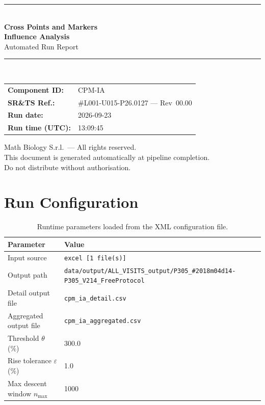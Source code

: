 \documentclass[a4paper,11pt]{article}
\begin{document}
\begin{titlepage}
\begin{center}
  \vspace*{1.8cm}
  {\color{dmaaccent}\rule{\linewidth}{1.5pt}}\\[0.6cm]
  {\LARGE\bfseries\color{dmaaccent}
    Cross Points and Markers\\[0.25cm]
    Influence Analysis}\\[0.4cm]
  {\Large Automated Run Report}\\[0.3cm]
  {\color{dmaaccent}\rule{\linewidth}{1.5pt}}\\[2cm]

  \begin{tabular}{ll}
    \textbf{Component ID:}   & CPM-IA \\[0.3cm]
    \textbf{SR\&TS Ref.:}    & \#L001-U015-P26.0127 --- Rev~00.00 \\[0.3cm]
    \textbf{Run date:}       & 2026-09-23 \\[0.3cm]
    \textbf{Run time (UTC):} & 13:09:45 \\
  \end{tabular}

  \vfill
  {\color{dmagray}\small
    Math Biology S.r.l.\ --- All rights reserved.\\
    This document is generated automatically at pipeline completion.\\
    Do not distribute without authorisation.}
\end{center}
\end{titlepage}

\tableofcontents
\clearpage

\section{Run Configuration}

\begin{table}[h!]
\centering
\small
\caption{Runtime parameters loaded from the XML configuration file.}
\begin{tabular}{ll}
\toprule
\textbf{Parameter} & \textbf{Value} \\
\midrule
Input source                      & \texttt{excel [1 file(s)]} \\
Output path                       & \texttt{data/output/ALL\_VISITS\_output/P305\_\#2018m04d14-P305\_V214\_FreeProtocol} \\
Detail output file                & \texttt{cpm\_ia\_detail.csv} \\
Aggregated output file            & \texttt{cpm\_ia\_aggregated.csv} \\
Threshold $\theta$ (\%)           & 300.0 \\
Rise tolerance $\varepsilon$ (\%) & 1.0 \\
Max descent window $n_{\max}$     & 1000 \\
\bottomrule
\end{tabular}
\end{table}
\end{document}
